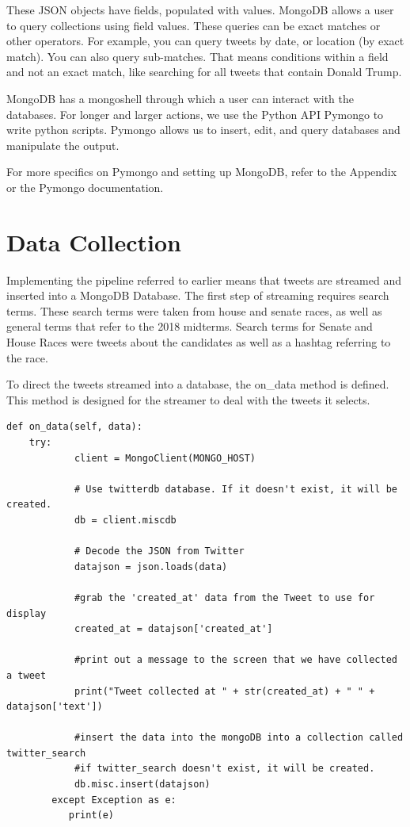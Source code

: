 \documentclass[11pt, twoside, reqno]{book}
\begin{document}
These JSON objects have fields, populated with values. MongoDB allows a user to query collections using field values. These queries can be exact matches or other operators. For example, you can query tweets by date, or location (by exact match). You can also query sub-matches. That means conditions within a field and not an exact match, like searching for all tweets that contain Donald Trump.

MongoDB has a mongoshell through which a user can interact with the databases. For longer and larger actions, we use the Python API Pymongo to write python scripts. Pymongo allows us to insert, edit, and query databases and manipulate the output. 

For more specifics on Pymongo and setting up MongoDB, refer to the Appendix or the Pymongo documentation.

\section{Data Collection}
\hspace{0.2in} 
Implementing the pipeline referred to earlier means that tweets are streamed and inserted into a MongoDB Database. The first step of streaming requires search terms. These search terms were taken from house and senate races, as well as general terms that refer to the 2018 midterms. Search terms for Senate and House Races were tweets about the candidates as well as a hashtag referring to the race. 

To direct the tweets streamed into a database, the on\_data method is defined. This method is designed for the streamer to deal with the tweets it selects.

\begin{verbatim}
def on_data(self, data):
	try:
            client = MongoClient(MONGO_HOST)

            # Use twitterdb database. If it doesn't exist, it will be created.
            db = client.miscdb

            # Decode the JSON from Twitter
            datajson = json.loads(data)

            #grab the 'created_at' data from the Tweet to use for display
            created_at = datajson['created_at']

            #print out a message to the screen that we have collected a tweet
            print("Tweet collected at " + str(created_at) + " " + datajson['text'])

            #insert the data into the mongoDB into a collection called twitter_search
            #if twitter_search doesn't exist, it will be created.
            db.misc.insert(datajson)
        except Exception as e:
           print(e)
\end{verbatim}
\end{document}
